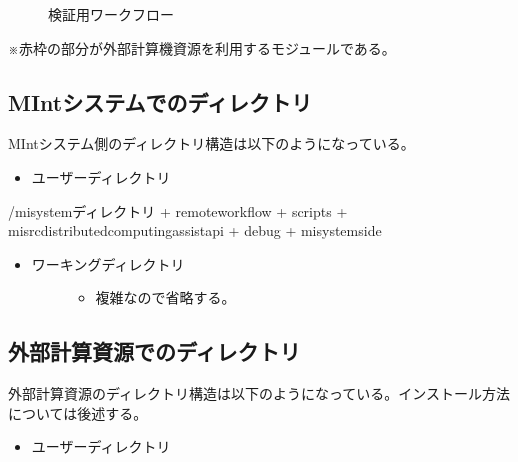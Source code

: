 \documentclass[letterpaper,10pt,dvipdfmx,openany]{sphinxmanual}
\begin{document}
\begin{figure}[htbp]
\centering
\capstart

\noindent{}
\caption{検証用ワークフロー}\label{\detokenize{using_distributed_properties:id47}}\end{figure}

※赤枠の部分が外部計算機資源を利用するモジュールである。

\newpage


\subsection{MIntシステムでのディレクトリ}
\label{\detokenize{using_distributed_properties:id20}}
MIntシステム側のディレクトリ構造は以下のようになっている。
\begin{itemize}
\item {} 
ユーザーディレクトリ

\end{itemize}

%
\begin{sphinxVerbatim}[commandchars=\\\{\}]
\PYGZti{}/misystemディレクトリ
 + remote\PYGZus{}workflow
   + scripts
 + misrc\PYGZus{}distributed\PYGZus{}computing\PYGZus{}assist\PYGZus{}api
   + debug
     + mi\PYGZhy{}system\PYGZhy{}side
\end{sphinxVerbatim}
\begin{itemize}
\item {} \begin{description}
\item[{ワーキングディレクトリ}] \leavevmode\begin{itemize}
\item {} 
複雑なので省略する。

\end{itemize}

\end{description}

\end{itemize}


\subsection{外部計算資源でのディレクトリ}
\label{\detokenize{using_distributed_properties:id21}}
外部計算資源のディレクトリ構造は以下のようになっている。インストール方法については後述する。
\begin{itemize}
\item {} 
ユーザーディレクトリ

\end{itemize}
\end{document}
